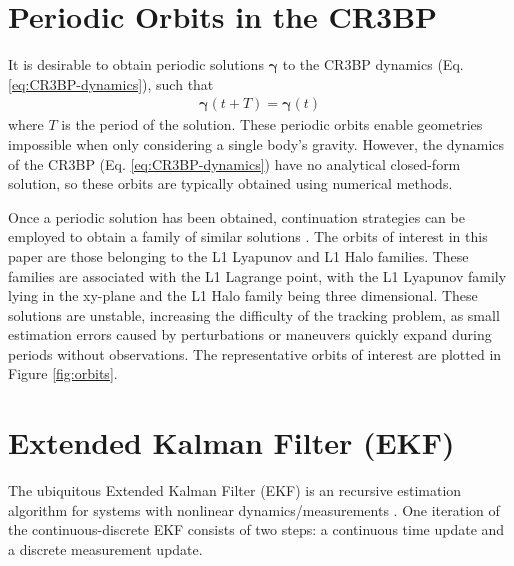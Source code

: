 \section{Periodic Orbits in the CR3BP}


It is desirable to obtain periodic solutions $\bm{\gamma}$ to the CR3BP dynamics (Eq. \ref{eq:CR3BP-dynamics}), such that
\begin{align}
    \bm{\gamma}(t + T) = \bm{\gamma}(t)
\end{align}
\noindent where $T$ is the period of the solution. These periodic orbits enable geometries impossible when only considering a single body's gravity. However, the dynamics of the CR3BP (Eq. \ref{eq:CR3BP-dynamics}) have no analytical closed-form solution, so these orbits are typically obtained using numerical methods.

Once a periodic solution has been obtained, continuation strategies can be employed to obtain a family of similar solutions \cite{williams2024dynamics}. The orbits of interest in this paper are those belonging to the L1 Lyapunov and L1 Halo families. These families are associated with the L1 Lagrange point, with the L1 Lyapunov family lying in the xy-plane and the L1 Halo family being three dimensional. These solutions are unstable, increasing the difficulty of the tracking problem, as small estimation errors caused by perturbations or maneuvers quickly expand during periods without observations. The representative orbits of interest are plotted in Figure \ref{fig:orbits}.

\section{Extended Kalman Filter (EKF)}

The ubiquitous Extended Kalman Filter (EKF) is an recursive estimation algorithm for systems with nonlinear dynamics/measurements \cite{smith1962application}. One iteration of the continuous-discrete EKF consists of two steps: a continuous time update and a discrete measurement update.

